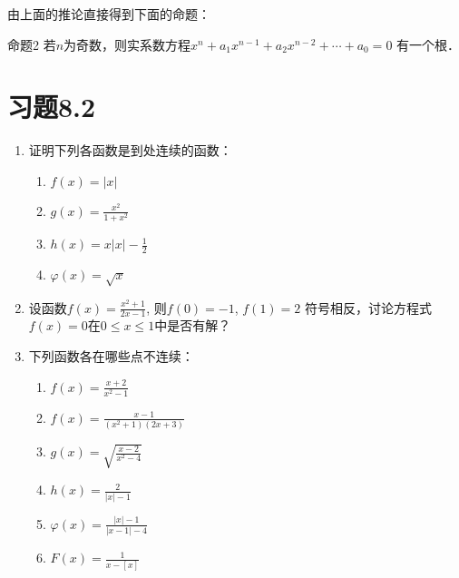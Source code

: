 由上面的推论直接得到下面的命题：
\begin{blk}{命题2}
    若$n$为奇数，则实系数方程$x^n+a_1x^{n-1}+a_2x^{n-2}+\cdots+a_0=0$
有一个根． 
\end{blk}

\section*{习题8.2}
\begin{enumerate}
    \item 证明下列各函数是到处连续的函数：
\begin{multicols}{2}
\begin{enumerate}
    \item $f(x)=|x|$
    \item $g(x)=\frac{x^2}{1+x^2}$
    \item $h(x)=x|x|-\frac{1}{2}$
    \item $\varphi(x)=\sqrt{x}$
\end{enumerate}
\end{multicols}

\item 设函数$f(x)=\frac{x^2+1}{2x-1}$, 
则$f(0)=-1$, $f(1)=2$
符号相反，讨论方程式$f(x)=0$在$0\le x\le 1$中是否有解？
\item 下列函数各在哪些点不连续：
\begin{multicols}{2}
\begin{enumerate}
    \item $f(x)=\frac{x+2}{x^2-1}$
    \item $f(x)=\frac{x-1}{(x^2+1)(2x+3)}$
    \item $g(x)=\sqrt{\frac{x-2}{x^2-4}}$
    \item $h(x)=\frac{2}{|x|-1}$
    \item $\varphi(x)=\frac{|x|-1}{|x-1|-4}$
    \item $F(x)=\frac{1}{x-[x]}$
\end{enumerate}
\end{multicols}


\end{enumerate}

